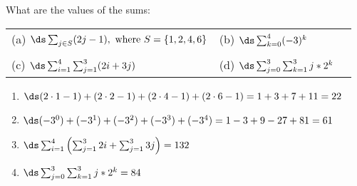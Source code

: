 \begin{questions}
 What are the values of the sums:\\
\begin{tabular}{lll}
    (a) $\ds \sum_{j\in S} (2j - 1), \text{ where } S = \{1, 2, 4, 6\}$
    & (b) $\ds \sum_{k=0}^{4} (-3)^k$ \\
    & & \\
    (c) $\ds \sum_{i=1}^{4} \sum_{j=1}^{3} (2i + 3j)$
    & (d) $\ds \sum_{j=0}^{3} \sum_{k=1}^{3} j*2^{k}$
\end{tabular}
    \ifprintanswers
        \vspace{-10pt}
   \fi
\begin{solution}
    \begin{enumerate}[label=(\alph*),itemsep=3pt,parsep=0pt,
    topsep=0pt,partopsep=0pt]
        \item $\ds (2\cdot1 - 1)+(2\cdot2 - 1)+(2\cdot4 -1)+(2\cdot6-1) = 1+3+7+11 = 22$ 
        \item $\ds (-3^0) + (-3^1) + (-3^2) + (-3^3) + (-3^4) = 1 -3 + 9 -27 + 81 = 61 $
        \item $\ds \sum_{i=1}^4 \left( \sum_{j=1}^3 2i + \sum_{j=1}^3 3j \right) = 132$
        \item $\ds \sum_{j=0}^3 \sum_{k=1}^3 j*2^k = 84$
    \end{enumerate}
\end{solution}



\end{questions}
